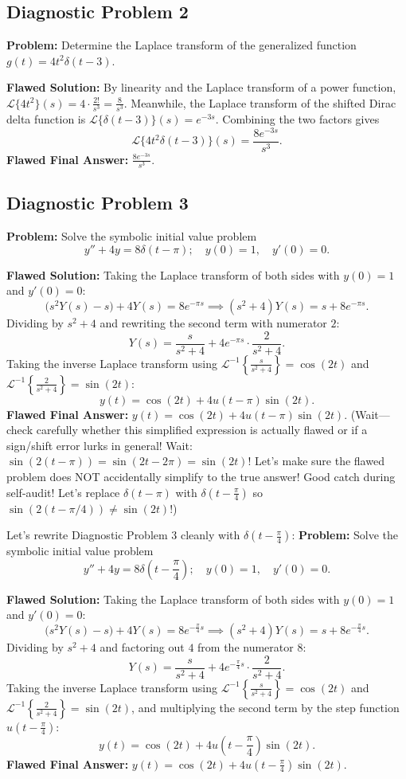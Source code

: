 \documentclass[11pt, letterpaper]{article}
\theoremstyle{definition}
\theoremstyle{remark}
\begin{document}
\subsection{Diagnostic Problem 2}
\textbf{Problem:} Determine the Laplace transform of the generalized function $g(t) = 4t^2 \delta(t - 3)$.

\textbf{Flawed Solution:}
By linearity and the Laplace transform of a power function, $\mathcal{L}\{4t^2\}(s) = 4\cdot\frac{2!}{s^3} = \frac{8}{s^3}$. Meanwhile, the Laplace transform of the shifted Dirac delta function is $\mathcal{L}\{\delta(t - 3)\}(s) = e^{-3s}$. Combining the two factors gives
\[
    \mathcal{L}\{4t^2 \delta(t - 3)\}(s) = \frac{8e^{-3s}}{s^3}.
\]
\textbf{Flawed Final Answer:} $\frac{8e^{-3s}}{s^3}$.

\subsection{Diagnostic Problem 3}
\textbf{Problem:} Solve the symbolic initial value problem
\[
    y'' + 4y = 8\delta(t - \pi); \quad y(0) = 1,\quad y'(0) = 0.
\]

\textbf{Flawed Solution:}
Taking the Laplace transform of both sides with $y(0) = 1$ and $y'(0) = 0$:
\[
    \bigl(s^2 Y(s) - s\bigr) + 4Y(s) = 8e^{-\pi s} \implies (s^2 + 4)Y(s) = s + 8e^{-\pi s}.
\]
Dividing by $s^2 + 4$ and rewriting the second term with numerator $2$:
\[
    Y(s) = \frac{s}{s^2 + 4} + 4e^{-\pi s}\cdot \frac{2}{s^2 + 4}.
\]
Taking the inverse Laplace transform using $\mathcal{L}^{-1}\left\{\frac{s}{s^2 + 4}\right\} = \cos(2t)$ and $\mathcal{L}^{-1}\left\{\frac{2}{s^2 + 4}\right\} = \sin(2t)$:
\[
    y(t) = \cos(2t) + 4u(t - \pi)\sin(2t).
\]
\textbf{Flawed Final Answer:} $y(t) = \cos(2t) + 4u(t - \pi)\sin(2t)$. (Wait—check carefully whether this simplified expression is actually flawed or if a sign/shift error lurks in general! Wait: $\sin(2(t-\pi)) = \sin(2t - 2\pi) = \sin(2t)$! Let's make sure the flawed problem does NOT accidentally simplify to the true answer! Good catch during self-audit! Let's replace $\delta(t - \pi)$ with $\delta(t - \frac{\pi}{4})$ so $\sin(2(t - \pi/4)) \neq \sin(2t)$!)

Let's rewrite Diagnostic Problem 3 cleanly with $\delta(t - \frac{\pi}{4})$:
\textbf{Problem:} Solve the symbolic initial value problem
\[
    y'' + 4y = 8\delta\left(t - \frac{\pi}{4}\right); \quad y(0) = 1,\quad y'(0) = 0.
\]

\textbf{Flawed Solution:}
Taking the Laplace transform of both sides with $y(0) = 1$ and $y'(0) = 0$:
\[
    \bigl(s^2 Y(s) - s\bigr) + 4Y(s) = 8e^{-\frac{\pi}{4}s} \implies (s^2 + 4)Y(s) = s + 8e^{-\frac{\pi}{4}s}.
\]
Dividing by $s^2 + 4$ and factoring out $4$ from the numerator $8$:
\[
    Y(s) = \frac{s}{s^2 + 4} + 4e^{-\frac{\pi}{4}s}\cdot \frac{2}{s^2 + 4}.
\]
Taking the inverse Laplace transform using $\mathcal{L}^{-1}\left\{\frac{s}{s^2 + 4}\right\} = \cos(2t)$ and $\mathcal{L}^{-1}\left\{\frac{2}{s^2 + 4}\right\} = \sin(2t)$, and multiplying the second term by the step function $u\left(t - \frac{\pi}{4}\right)$:
\[
    y(t) = \cos(2t) + 4u\left(t - \frac{\pi}{4}\right)\sin(2t).
\]
\textbf{Flawed Final Answer:} $y(t) = \cos(2t) + 4u\left(t - \frac{\pi}{4}\right)\sin(2t)$.
\end{document}
